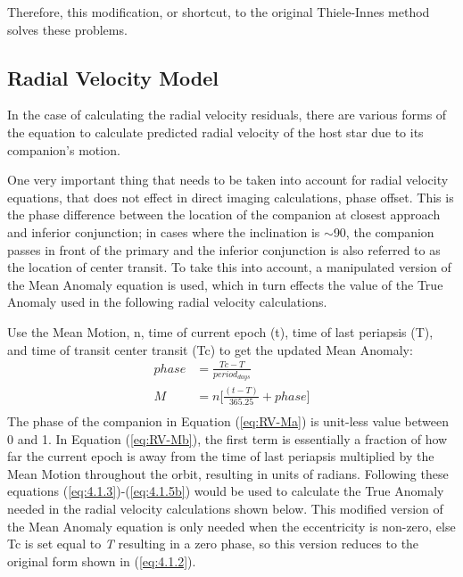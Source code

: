 \documentclass[10pt,preprint]{aastex}
\begin{document}
Therefore, this modification, or shortcut, to the original Thiele-Innes method solves these problems.

\clearpage

\subsection{Radial Velocity Model}\label{sec:RV-OrbModels}

In the case of calculating the radial velocity residuals, there are various forms of the equation to calculate predicted radial velocity of the host star due to its companion's motion.

One very important thing that needs to be taken into account for radial velocity equations, that does not effect in direct imaging calculations, phase offset.  This is the phase difference between the location of the companion at closest approach and inferior conjunction; in cases where the inclination is $\sim$90, the companion passes in front of the primary and the inferior conjunction is also referred to as the location of center transit.  To take this into account, a manipulated version of the Mean Anomaly equation is used, which in turn effects the value of the True Anomaly used in the following radial velocity calculations.

Use the Mean Motion, n, time of current epoch (t), time of last periapsis (T), and time of transit center transit (Tc) to get the updated Mean Anomaly:
\begin{subequations}\label{eq:RV-Ma}
\begin{align}
phase& = \frac{Tc-T}{period_{days}} \\
\label{eq:RV-Mb}
M& = n \bigg[ \frac{(t-T)}{365.25} +phase \bigg]\\
\end{align}
\end{subequations}
The phase of the companion in Equation (\ref{eq:RV-Ma}) is unit-less value between 0 and 1.  In Equation (\ref{eq:RV-Mb}), the first term is essentially a fraction of how far the current epoch is away from the time of last periapsis multiplied by the Mean Motion throughout the orbit, resulting in units of radians.  Following these equations (\ref{eq:4.1.3})-(\ref{eq:4.1.5b}) would be used to calculate the True Anomaly needed in the radial velocity calculations shown below.  This modified version of the Mean Anomaly equation is only needed when the eccentricity is non-zero, else Tc is set equal to {\it T} resulting in a zero phase, so this version reduces to the original form shown in (\ref{eq:4.1.2}).
\end{document}
